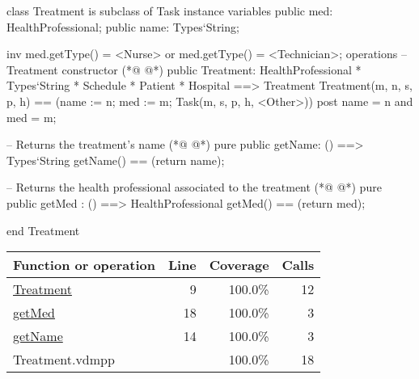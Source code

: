 \begin{vdmpp}[breaklines=true]
class Treatment is subclass of Task
instance variables
  public med: HealthProfessional;
  public name: Types`String;
  
  inv med.getType() = <Nurse> or med.getType() = <Technician>;
operations
 -- Treatment constructor
(*@
\label{Treatment:9}
@*)
 public Treatment: HealthProfessional * Types`String * Schedule * Patient * Hospital ==> Treatment
  Treatment(m, n, s, p, h) == (name := n; med := m; Task(m, s, p, h, <Other>))
 post name = n and med = m;
 
 -- Returns the treatment's name
(*@
\label{getName:14}
@*)
 pure public getName: () ==> Types`String
  getName() == (return name);
 
 -- Returns the health professional associated to the treatment
(*@
\label{getMed:18}
@*)
 pure public getMed : () ==> HealthProfessional
  getMed() == (return med);

end Treatment
\end{vdmpp}
\bigskip
\begin{longtable}{|l|r|r|r|}
\hline
Function or operation & Line & Coverage & Calls \\
\hline
\hline
\hyperref[Treatment:9]{Treatment} & 9&100.0\% & 12 \\
\hline
\hyperref[getMed:18]{getMed} & 18&100.0\% & 3 \\
\hline
\hyperref[getName:14]{getName} & 14&100.0\% & 3 \\
\hline
\hline
Treatment.vdmpp & & 100.0\% & 18 \\
\hline
\end{longtable}

